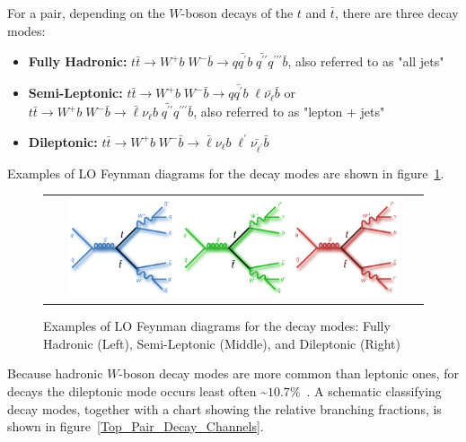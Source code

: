 For a \ttbar pair, depending on the $W$-boson decays of the $t$ and $\bar{t}$, there are three decay modes: 
\begin{itemize}
    \item {\bf Fully Hadronic:} $t\bar{t} \rightarrow W^+ b \; W^- \bar{b} \rightarrow q \bar{q^\prime} b \; \bar{q^{\prime\prime}}  q^{\prime\prime\prime} \bar{b}$, also referred to as "all jets"
    \item {\bf Semi-Leptonic:} $t\bar{t} \rightarrow W^+ b \; W^- \bar{b} \rightarrow  q \bar{q^\prime} b \; \ell \bar{\nu_{\ell}} \bar{b} $ or $t\bar{t} \rightarrow W^+ b \; W^- \bar{b} \rightarrow  \bar{\ell} \nu_\ell b \; \bar{q^{\prime\prime}}  q^{\prime\prime\prime} \bar{b}$, also referred to as "lepton + jets"
    \item {\bf Dileptonic:} $t\bar{t} \rightarrow W^+ b \; W^- \bar{b} \rightarrow \bar{\ell} \nu_\ell b \; \ell^{\prime} \bar{\nu_{\ell^{\prime}}} \bar{b}$
\end{itemize}
Examples of LO Feynman diagrams for the \ttbar decay modes are shown in figure~\ref{Top_Pair_Decay_FeynmanDiagrams}.
\begin{figure}[!htb]
  \begin{center}
    \begin{tabular}{c}
        \includegraphics[width=0.90\textwidth]{fig_TopQuark/ttbar_decay_feynman_diagrams.png}
    \end{tabular}
    \caption{Examples of LO Feynman diagrams for the \ttbar decay modes: Fully Hadronic (Left), Semi-Leptonic (Middle), and Dileptonic (Right)~\cite{d0_diagrams}
            }
    \label{Top_Pair_Decay_FeynmanDiagrams}
  \end{center}
\end{figure}
Because hadronic $W$-boson decay modes are more common than leptonic ones, for \ttbar decays the dileptonic mode occurs least often \sim$10.7 \%$~\cite{bib:PDG}.
A schematic classifying \ttbar decay modes, together with a chart showing the relative branching fractions, is shown in figure~\ref{Top_Pair_Decay_Channels}.
